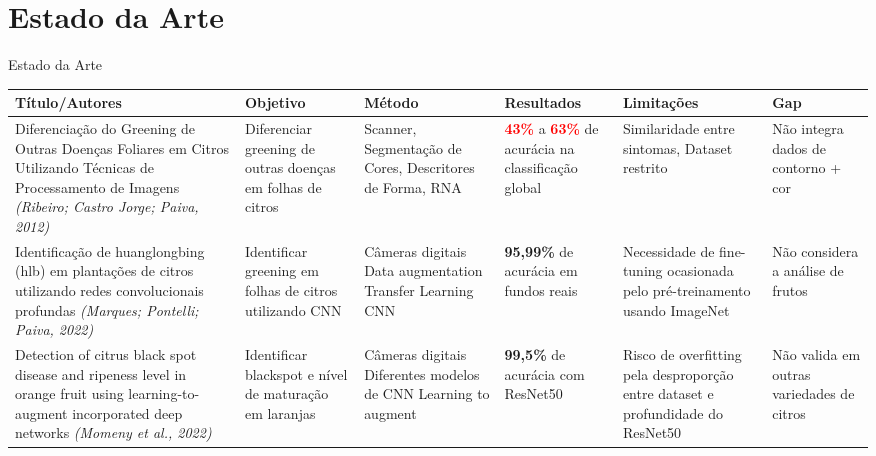 \documentclass[aspectratio=169]{beamer}
\begin{document}
\section{Estado da Arte}


\begin{frame}[t]{Estado da Arte}
  \scriptsize
  
  
  \vspace{0.3cm}
  
  \begin{table}
    \centering
    \tiny
    \begin{tabular}{|p{2.5cm}|p{2cm}|p{2cm}|p{2cm}|p{2cm}|p{1.5cm}|}
      \hline
      \textbf{Título/Autores} & \textbf{Objetivo} & \textbf{Método} & \textbf{Resultados} & \textbf{Limitações} & \textbf{Gap} \\
      \hline
      Diferenciação do Greening de Outras Doenças Foliares em Citros Utilizando Técnicas de Processamento de Imagens \textit{(Ribeiro; Castro Jorge; Paiva, 2012)} & Diferenciar greening de outras doenças em folhas de citros & Scanner, Segmentação de Cores, Descritores de Forma, RNA & \textcolor{red}{\textbf{43\%}} a \textcolor{red}{\textbf{63\%}} de acurácia na classificação global & Similaridade entre sintomas, Dataset restrito & Não integra dados de contorno + cor \\
      \hline
      Identificação de huanglongbing (hlb) em plantações de citros utilizando redes convolucionais profundas \textit{(Marques; Pontelli; Paiva, 2022)} & Identificar greening em folhas de citros utilizando CNN & Câmeras digitais \break Data augmentation \break Transfer Learning \break CNN & \textcolor{verdeClaro}{\textbf{95,99\%}} de acurácia em fundos reais & Necessidade de fine-tuning ocasionada pelo pré-treinamento usando ImageNet & Não considera a análise de frutos \\
      \hline
      Detection of citrus black spot disease and ripeness level in orange fruit using learning-to-augment incorporated deep networks \textit{(Momeny et al., 2022)} & Identificar blackspot e nível de maturação em laranjas & Câmeras digitais \break Diferentes modelos de CNN \break Learning to augment & \textcolor{verdeClaro}{\textbf{99,5\%}} de acurácia com ResNet50 & Risco de overfitting pela desproporção entre dataset e profundidade do ResNet50 & Não valida em outras variedades de citros \\
      \hline
    \end{tabular}
  \end{table}
\end{frame}
\end{document}
